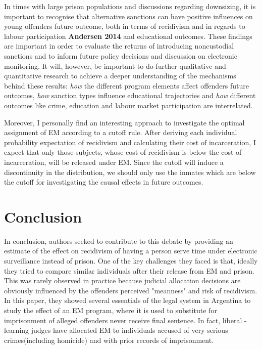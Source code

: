 \documentclass[a4paper,12pt]{article}
\begin{document}
In times with large prison populations and discussions regarding downsizing, it is important to recognise that alternative sanctions can have positive influences on young offenders future outcome, both in terms of recidivism and in regards to labour participation \textbf{Andersen 2014} \cite{Andersen2014} and educational outcomes. These findings are important in order to evaluate the returns of introducing noncustodial sanctions and to inform future policy decisions and discussion on electronic monitoring. It will, however, be important to do further qualitative and quantitative research to achieve a deeper understanding of the mechanisms behind these results: \textit{how} the different program elements affect offenders future outcomes, \textit{how} sanction types influence educational trajectories and \textit{how} different outcomes like crime, education and labour market participation are interrelated. 

Moreover, I personally find an interesting approach to investigate the optimal assignment of EM according to a cutoff rule. After deriving each individual probability expectation of recidivism and calculating their cost of incarceration, I expect that only those subjects, whose cost of recidivism is below the cost of incarceration, will be released under EM. Since the cutoff will induce a discontinuity in the distribution, we should only use the  inmates which are below the cutoff for investigating the causal effects in future outcomes. 

\section{Conclusion}
In conclusion, authors seeked to contribute to this debate by providing an estimate of the effect on recidivism of having a person serve time under electronic surveillance instead of prison. One of the key challenges they faced is that, ideally they tried to compare similar individuals after their release from EM and prison. This was rarely observed in practice because judicial allocation decisions are obviously influenced by the offenders perceived "meanness" and risk of recidivism. In this paper, they showed several essentials of the legal system in Argentina to study the effect of an EM program, where it is used to substitute for imprisonment of alleged offenders never receive final sentence. In fact, liberal - learning judges have allocated EM to individuals accused of very serious crimes(including homicide) and with prior records of imprisonment. 
\end{document}
